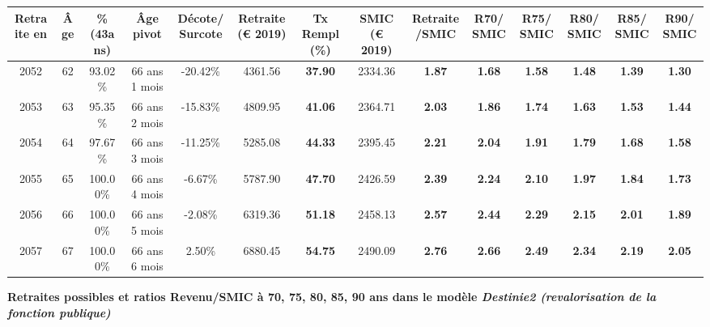 \begin{adjustbox}{max width=\textwidth} 
\begin{tabular}[htb]{|c|c||c|c|c||c|c||c|c||c|c|c|c|c|} 
\hline 
 Retraite en &  Âge &  \%(43ans) &  Âge pivot &  Décote/Surcote &  Retraite (\euro{} 2019) &  Tx Rempl(\%) &  SMIC (\euro{} 2019) &  Retraite/SMIC &  R70/SMIC &  R75/SMIC &  R80/SMIC &  R85/SMIC &  R90/SMIC \\ 
\hline \hline 
 2052 &  62 &  93.02\% &  66 ans 1 mois &  -20.42\% &  4361.56 &  {\bf 37.90} &  2334.36 &  {\bf 1.87} &  {\bf 1.68} &  {\bf 1.58} &  {\bf 1.48} &  {\bf 1.39} &  {\bf 1.30} \\ 
\hline 
 2053 &  63 &  95.35\% &  66 ans 2 mois &  -15.83\% &  4809.95 &  {\bf 41.06} &  2364.71 &  {\bf 2.03} &  {\bf 1.86} &  {\bf 1.74} &  {\bf 1.63} &  {\bf 1.53} &  {\bf 1.44} \\ 
\hline 
 2054 &  64 &  97.67\% &  66 ans 3 mois &  -11.25\% &  5285.08 &  {\bf 44.33} &  2395.45 &  {\bf 2.21} &  {\bf 2.04} &  {\bf 1.91} &  {\bf 1.79} &  {\bf 1.68} &  {\bf 1.58} \\ 
\hline 
 2055 &  65 &  100.00\% &  66 ans 4 mois &  -6.67\% &  5787.90 &  {\bf 47.70} &  2426.59 &  {\bf 2.39} &  {\bf 2.24} &  {\bf 2.10} &  {\bf 1.97} &  {\bf 1.84} &  {\bf 1.73} \\ 
\hline 
 2056 &  66 &  100.00\% &  66 ans 5 mois &  -2.08\% &  6319.36 &  {\bf 51.18} &  2458.13 &  {\bf 2.57} &  {\bf 2.44} &  {\bf 2.29} &  {\bf 2.15} &  {\bf 2.01} &  {\bf 1.89} \\ 
\hline 
 2057 &  67 &  100.00\% &  66 ans 6 mois &  2.50\% &  6880.45 &  {\bf 54.75} &  2490.09 &  {\bf 2.76} &  {\bf 2.66} &  {\bf 2.49} &  {\bf 2.34} &  {\bf 2.19} &  {\bf 2.05} \\ 
\hline 
\hline 
\end{tabular} 
\end{adjustbox} 
 
 \vspace{0.1cm} 
{\bf \noindent Retraites possibles et ratios Revenu/SMIC à 70, 75, 80, 85, 90 ans dans le modèle \emph{Destinie2 (revalorisation de la fonction publique)}}  
 
